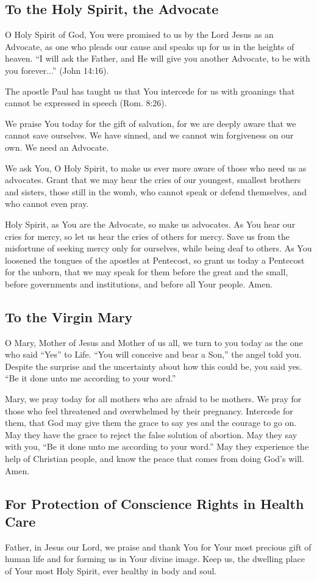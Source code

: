\documentclass[12pt]{article}
\newcommand{\prayertitle}[1]{\subsection{#1}}
\begin{document}
\prayertitle{To the Holy Spirit, the Advocate}
O Holy Spirit of God, You were promised to us by the Lord Jesus as an Advocate, as one who pleads our cause and speaks up for us in the heights of heaven.
``I will ask the Father, and He will give you another Advocate, to be with you forever...'' (John 14:16).

The apostle Paul has taught us that You intercede for us with groanings that cannot be expressed in speech (Rom. 8:26).

We praise You today for the gift of salvation, for we are deeply aware that we cannot save ourselves.
We have sinned, and we cannot win forgiveness on our own.
We need an Advocate.

We ask You, O Holy Spirit, to make us ever more aware of those who need us as advocates.
Grant that we may hear the cries of our youngest, smallest brothers and sisters, those still in the womb, who cannot speak or defend themselves, and who cannot even pray.

Holy Spirit, as You are the Advocate, so make us advocates.
As You hear our cries for mercy, so let us hear the cries of others for mercy.
Save us from the misfortune of seeking mercy only for ourselves, while being deaf to others.
As You loosened the tongues of the apostles at Pentecost, so grant us today a Pentecost for the unborn, that we may speak for them before the great and the small, before governments and institutions, and before all Your people.
Amen.

\prayertitle{To the Virgin Mary}
O Mary, Mother of Jesus and Mother of us all, we turn to you today as the one who said ``Yes'' to Life.
``You will conceive and bear a Son,'' the angel told you.
Despite the surprise and the uncertainty about how this could be, you said yes.
``Be it done unto me according to your word.''

Mary, we pray today for all mothers who are afraid to be mothers.
We pray for those who feel threatened and overwhelmed by their pregnancy.
Intercede for them, that God may give them the grace to say yes and the courage to go on.
May they have the grace to reject the false solution of abortion.
May they say with you, ``Be it done unto me according to your word.''
May they experience the help of Christian people, and know the peace that comes from doing God's will.
Amen.

\prayertitle{For Protection of Conscience Rights in Health Care}
Father, in Jesus our Lord, we praise and thank You for Your most precious gift of human life and for forming us in Your divine image.
Keep us, the dwelling place of Your most Holy Spirit, ever healthy in body and soul.
\end{document}
